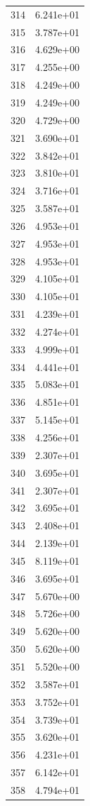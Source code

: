 \documentclass[12pt]{article}
\begin{document}
\begin{longtable}{@{}cc@{}}
314 & 6.241e+01 \\
315 & 3.787e+01 \\
316 & 4.629e+00 \\
317 & 4.255e+00 \\
318 & 4.249e+00 \\
319 & 4.249e+00 \\
320 & 4.729e+00 \\
321 & 3.690e+01 \\
322 & 3.842e+01 \\
323 & 3.810e+01 \\
324 & 3.716e+01 \\
325 & 3.587e+01 \\
326 & 4.953e+01 \\
327 & 4.953e+01 \\
328 & 4.953e+01 \\
329 & 4.105e+01 \\
330 & 4.105e+01 \\
331 & 4.239e+01 \\
332 & 4.274e+01 \\
333 & 4.999e+01 \\
334 & 4.441e+01 \\
335 & 5.083e+01 \\
336 & 4.851e+01 \\
337 & 5.145e+01 \\
338 & 4.256e+01 \\
339 & 2.307e+01 \\
340 & 3.695e+01 \\
341 & 2.307e+01 \\
342 & 3.695e+01 \\
343 & 2.408e+01 \\
344 & 2.139e+01 \\
345 & 8.119e+01 \\
346 & 3.695e+01 \\
347 & 5.670e+00 \\
348 & 5.726e+00 \\
349 & 5.620e+00 \\
350 & 5.620e+00 \\
351 & 5.520e+00 \\
352 & 3.587e+01 \\
353 & 3.752e+01 \\
354 & 3.739e+01 \\
355 & 3.620e+01 \\
356 & 4.231e+01 \\
357 & 6.142e+01 \\
358 & 4.794e+01 \\

\end{longtable}
\end{document}
